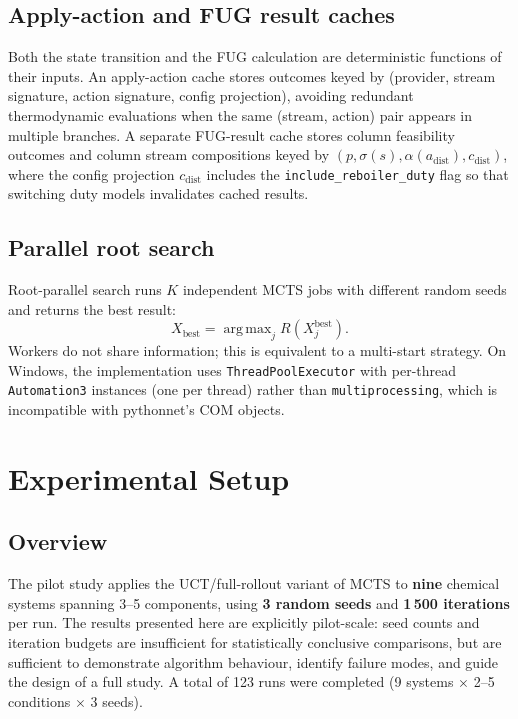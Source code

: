 \documentclass[11pt,a4paper]{article}
\theoremstyle{definition}
\theoremstyle{plain}
\DeclareMathOperator*{\argmax}{arg\,max}
\begin{document}
\subsection{Apply-action and FUG result caches}
\label{sec:caches}

Both the state transition and the FUG calculation are deterministic functions of their inputs. An apply-action cache stores outcomes keyed by (provider, stream signature, action signature, config projection), avoiding redundant thermodynamic evaluations when the same (stream, action) pair appears in multiple branches. A separate FUG-result cache stores column feasibility outcomes and column stream compositions keyed by $(p, \sigma(s), \alpha(a_{\mathrm{dist}}), c_{\mathrm{dist}})$, where the config projection $c_{\mathrm{dist}}$ includes the \texttt{include\_reboiler\_duty} flag so that switching duty models invalidates cached results.

\subsection{Parallel root search}
\label{sec:parallel}

Root-parallel search runs $K$ independent MCTS jobs with different random seeds and returns the best result: \begin{equation}  X_{\mathrm{best}} = \argmax_j R(X_j^{\mathrm{best}}). \end{equation} Workers do not share information; this is equivalent to a multi-start strategy. On Windows, the implementation uses \texttt{ThreadPoolExecutor} with per-thread \texttt{Automation3} instances (one per thread) rather than \texttt{multiprocessing}, which is incompatible with pythonnet's COM objects.

\section{Experimental Setup}
\label{sec:setup}

\subsection{Overview}

The pilot study applies the UCT/full-rollout variant of MCTS to \textbf{nine} chemical systems spanning 3--5 components, using \textbf{3 random seeds} and \textbf{1\,500 iterations} per run. The results presented here are explicitly pilot-scale: seed counts and iteration budgets are insufficient for statistically conclusive comparisons, but are sufficient to demonstrate algorithm behaviour, identify failure modes, and guide the design of a full study. A total of 123 runs were completed (9 systems $\times$ 2--5 conditions $\times$ 3 seeds).
\end{document}
